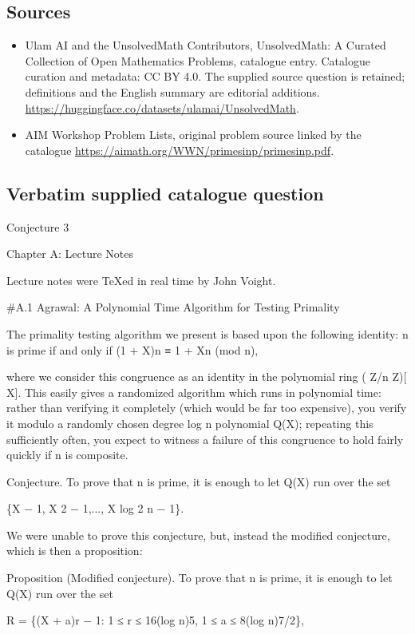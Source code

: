 \documentclass[11pt]{article}
\begin{document}
\subsection{Sources}
\begin{itemize}
\item[S1] Ulam AI and the UnsolvedMath Contributors, UnsolvedMath: A Curated Collection of Open Mathematics Problems, catalogue entry. Catalogue curation and metadata: CC BY 4.0. The supplied source question is retained; definitions and the English summary are editorial additions.
\url{https://huggingface.co/datasets/ulamai/UnsolvedMath}.
\item[S2] AIM Workshop Problem Lists, original problem source linked by the catalogue
\url{https://aimath.org/WWN/primesinp/primesinp.pdf}.
\end{itemize}
\subsection{Verbatim supplied catalogue question}
Conjecture 3

Chapter A: Lecture Notes

Lecture notes were TeXed in real time by John Voight.

\#A.1 Agrawal: A Polynomial Time Algorithm for Testing Primality

The primality testing algorithm we present is based upon the following identity: n is prime if and only if (1 + X)n ≡ 1 + Xn (mod n),

where we consider this congruence as an identity in the polynomial ring ( Z/n Z)[ X]. This easily gives a randomized algorithm which runs in polynomial time: rather than verifying it completely (which would be far too expensive), you verify it modulo a randomly chosen degree log n polynomial Q(X); repeating this sufficiently often, you expect to witness a failure of this congruence to hold fairly quickly if n is composite.

Conjecture. To prove that n is prime, it is enough to let Q(X) run over the set

\{X − 1, X 2 − 1,..., X log 2 n − 1\}.

We were unable to prove this conjecture, but, instead the modified conjecture, which is then a proposition:

Proposition (Modified conjecture). To prove that n is prime, it is enough to let Q(X) run over the set

R = \{(X + a)r − 1: 1 ≤ r ≤ 16(log n)5, 1 ≤ a ≤ 8(log n)7/2\},
\end{document}
